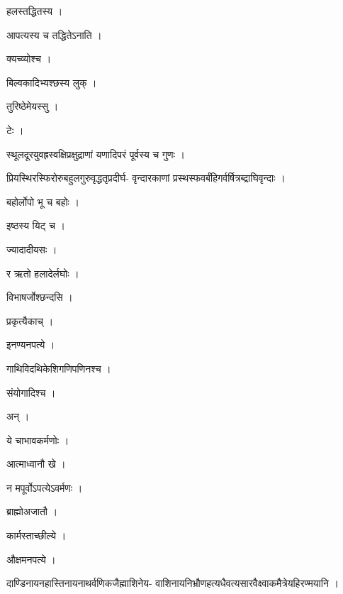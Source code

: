 \documentclass[10pt, openany]{book}
\begin{document}
\noindent हलस्तद्धितस्य ।

\noindent आपत्यस्य च तद्धितेऽनाति ।

\noindent क्यच्व्योश्च ।

\noindent बिल्वकादिभ्यश्छस्य लुक् ।

\noindent तुरिष्ठेमेयस्सु ।

\noindent टेः ।

\noindent स्थूलदूरयुवह्रस्वक्षिप्रक्षुद्राणां यणादिपरं पूर्वस्य च गुणः ।

\noindent प्रियस्थिरस्फिरोरुबहुलगुरुवृद्धतृप्रदीर्घ- वृन्दारकाणां प्रस्थस्फवर्बंहिगर्वर्षित्रब्द्राघिवृन्दाः ।

\noindent बहोर्लोपो भू च बहोः ।

\noindent इष्ठस्य यिट् च ।

\noindent ज्यादादीयसः ।

\noindent र ऋतो हलादेर्लघोः ।

\noindent विभाषर्जोश्छन्दसि ।

\noindent प्रकृत्यैकाच् ।

\noindent इनण्यनपत्ये ।

\noindent गाथिविदथिकेशिगणिपणिनश्च ।

\noindent संयोगादिश्च ।

\noindent अन् ।

\noindent ये चाभावकर्मणोः ।

\noindent आत्माध्वानौ खे ।

\noindent न मपूर्वोऽपत्येऽवर्मणः ।

\noindent ब्राह्मोअजातौ ।

\noindent कार्मस्ताच्छील्ये ।

\noindent औक्षमनपत्ये ।

\noindent दाण्डिनायनहास्तिनायनाथर्वणिकजैह्माशिनेय- वाशिनायनिभ्रौणहत्यधैवत्यसारवैक्ष्वाकमैत्रेयहिरण्मयानि ।
\end{document}
